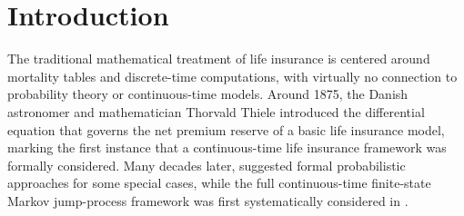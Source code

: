 \documentclass[11pt,leqno]{amsart}
\numberwithin{table}{section}
\numberwithin{figure}{section}
\numberwithin{equation}{section}
\newcommand{\1}{{\mathds{1}}}
\newcommand{\0}{\mat{0}}
\begin{document}
\section{Introduction}

The traditional mathematical treatment of life insurance is centered around mortality tables and discrete-time computations, with virtually no connection to probability theory or continuous-time models. Around 1875, the Danish astronomer and mathematician Thorvald Thiele introduced the differential equation that governs the net premium reserve of a basic life insurance model, marking the first instance that a continuous-time life insurance framework was formally considered. Many decades later, \cite{sverdrup1952basic,hickman1964statistical} suggested formal probabilistic approaches for some special cases, while the full continuous-time finite-state Markov jump-process framework was first systematically considered in \cite{hoem1969markov}.
\end{document}
